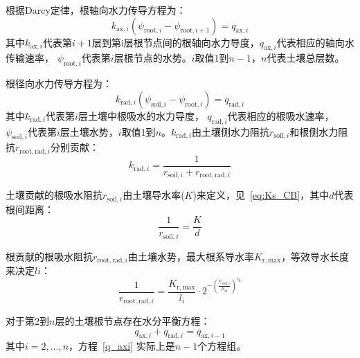 根据Darcy定律，根轴向水力传导方程为：
\begin{equation}\label{k_axi}
  k_{\mathrm{ax},i}\left(\psi_{\mathrm{root},i}-\psi_{\mathrm{root},i+1}\right)=q_{\mathrm{ax},i}
\end{equation}
其中$k_{\mathrm{ax},i}$代表第$i+1$层到第i层根节点间的根轴向水力导度，$q_{\mathrm{ax},i}$代表相应的轴向水传输速率，
$\psi_{\mathrm{root},i}$代表第$i$层根节点的水势。$i$取值1到$n-1$，$n$代表土壤总层数。

根径向水力传导方程为：
\begin{equation}\label{k_radi}
  k_{\mathrm{rad},i}\left(\psi_{\mathrm{soil},i}-\psi_{\mathrm{root},i}\right)=q_{\mathrm{rad},i}
\end{equation}
其中$k_{\mathrm{rad},i}$代表第$i$层土壤中根吸水的水力导度，
$q_{\mathrm{rad},i}$代表相应的根吸水速率，$\psi_{\mathrm{soil},i}$代表第$i$层土壤水势，$i$取值1到$n$。$k_{\mathrm{rad},i}$由土壤侧水力阻抗$r_{\mathrm{soil},i}$和根侧水力阻抗$r_{\mathrm{root,rad},i}$分别贡献：
\begin{equation}\label{k_radi_r}
    k_{\mathrm{rad},i}=\frac{1}{r_{\mathrm{soil},i}+r_{\mathrm{root,rad},i}}
\end{equation}

土壤贡献的根吸水阻抗$r_{\mathrm{soil},i}$由土壤导水率($K$)来定义，见~\eqref{eq:Ks_CB}，其中$d$代表根间距离：
\begin{equation}
    \frac{1}{r_{\mathrm{soil},i}}=\frac{K}{d}
\end{equation}

根贡献的根吸水阻抗$r_{\mathrm{root,rad},i}$由土壤水势，最大根系导水率$K_{\mathrm{r,max}}$，等效导水长度来决定$l{i}$：
\begin{equation}
  \frac{1}{r_{\mathrm{root,rad},i}}=\frac{K_{\mathrm{r,max}}}{l_{i}}\cdot 2^{-\left(\frac{\psi_{\mathrm{soil},i}}{p_{50}}\right)^{c_{\mathrm{k}}}}
\end{equation}

对于第2到$n$层的土壤根节点存在水分平衡方程：
\begin{equation}\label{q_axi}
  q_{\mathrm{a x},i}+q_{\mathrm{r a d},i}=q_{\mathrm{a x}, i-1}
\end{equation}
其中$i=2, \ldots, n$，方程~\eqref{q_axi} 实际上是$n-1$个方程组。


